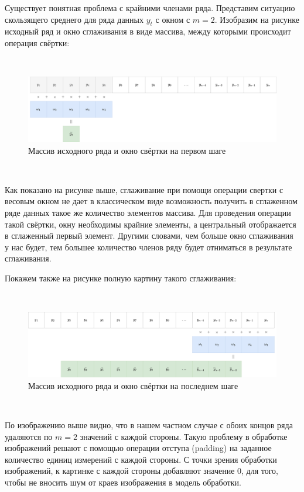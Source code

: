 \documentclass[
]{article}
\begin{document}
Существует понятная проблема с крайними членами ряда. Представим
ситуацию скользящего среднего для ряда данных \(y_t\) с окном с
\(m = 2\). Изобразим на рисунке исходный ряд и окно сглаживания в виде
массива, между которыми происходит операция свёртки:

\(\ \)

\begin{figure}
\centering
\includegraphics{Statistics-Свёртка1.drawio.png}
\caption{Массив исходного ряда и окно свёртки на первом шаге}
\end{figure}

\(\ \)

Как показано на рисунке выше, сглаживание при помощи операции свертки с
весовым окном не дает в классическом виде возможность получить в
сглаженном ряде данных такое же количество элементов массива. Для
проведения операции такой свёртки, окну необходимы крайние элементы, а
центральный отображается в сглаженный первый элемент. Другими словами,
чем больше окно сглаживания у нас будет, тем большее количество членов
ряду будет отниматься в результате сглаживания.

Покажем также на рисунке полную картину такого сглаживания:

\(\ \)

\begin{figure}
\centering
\includegraphics{Statistics-Свёртка2.drawio.png}
\caption{Массив исходного ряда и окно свёртки на последнем шаге}
\end{figure}

\(\ \)

По изображению выше видно, что в нашем частном случае с обоих концов
ряда удаляются по \(m = 2\) значений с каждой стороны. Такую проблему в
обработке изображений решают с помощью операции отступа (padding) на
заданное количество единиц измерений с каждой стороны. С точки зрения
обработки изображений, к картинке с каждой стороны добавляют значение
\(0\), для того, чтобы не вносить шум от краев изображения в модель
обработки.
\end{document}
